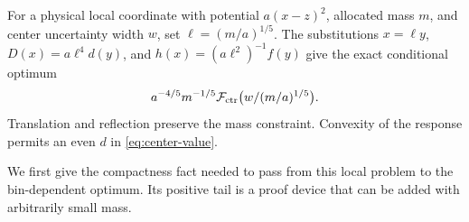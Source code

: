 For a physical local coordinate with potential $a(x-z)^2$, allocated
mass $m$, and center uncertainty width $w$, set
$\ell=(m/a)^{1/5}$. The substitutions $x=\ell y$,
$D(x)=a\ell^4d(y)$, and $h(x)=(a\ell^2)^{-1}f(y)$ give the exact
conditional optimum
\begin{equation}\label{eq:center-scaling}
       a^{-4/5}m^{-1/5}
                    \mathcal F_{\rm ctr}\bigl(w/(m/a)^{1/5}\bigr).
\end{equation}
Translation and reflection preserve the mass constraint. Convexity
of the response permits an even $d$ in \eqref{eq:center-value}.

We first give the compactness fact needed to pass from this local
problem to the bin-dependent optimum. Its positive tail is a
proof device that can be added with arbitrarily small mass.

